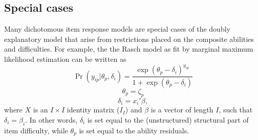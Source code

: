 \documentclass[12pt, letterpaper]{article}
\begin{document}

%


\subsection{Special cases}
\label{sec:special-cases}

Many dichotomous item response models are special cases of the doubly explanatory model that arise from restrictions placed on the composite abilities and difficulties. For example, the the Rasch model \parencite{Rasch1960a} as fit by marginal maximum likelihood estimation \parencite{bock1981marginal} can be written as
\begin{equation}
	\Pr ( y_{ip} | \theta_p, \delta_i) =
	\frac {\exp(\theta_p - \delta_i)^{y_{ip}}}
	{1 + \exp(\theta_p - \delta_i)}
\end{equation}
\begin{equation}
	\theta_p = \zeta_p
\end{equation}
\begin{equation}
	\delta_i = x_i' \beta
,\end{equation}
where $X$ is an $I \times I$ identity matrix ($I_I$) and $\beta$ is a vector of length $I$, such that $\delta_i = \beta_i$. In other words, $\delta_i$ is set equal to the (unstructured) structural part of item difficulty, while $\theta_p$ is set equal to the ability residuals.
\end{document}
